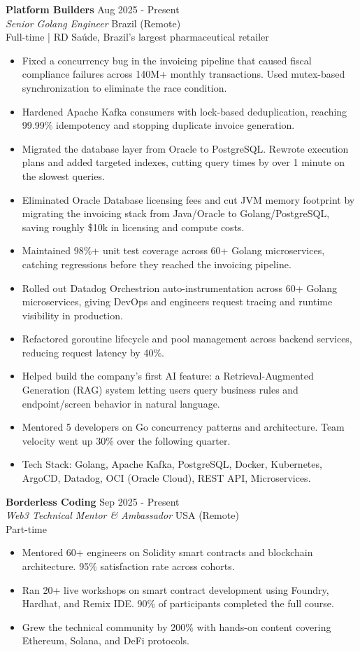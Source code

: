 \documentclass[10pt,a4paper]{article}
\newcommand{\rolehead}[4]{%
    \needspace{4\baselineskip}%
    \textbf{#1} \hfill #2\\
    \textit{#3} \hfill #4\\
}
\begin{document}
\rolehead{Platform Builders}{Aug 2025 - Present}{Senior Golang Engineer}{Brazil (Remote)}
{\footnotesize Full-time | RD Sa\'{u}de, Brazil's largest pharmaceutical retailer}
\nopagebreak
\begin{itemize}
    \item {\footnotesize Fixed a concurrency bug in the invoicing pipeline that caused fiscal compliance failures across 140M+ monthly transactions. Used mutex-based synchronization to eliminate the race condition.}
    \item {\footnotesize Hardened Apache Kafka consumers with lock-based deduplication, reaching 99.99\% idempotency and stopping duplicate invoice generation.}
    \item {\footnotesize Migrated the database layer from Oracle to PostgreSQL. Rewrote execution plans and added targeted indexes, cutting query times by over 1 minute on the slowest queries.}
    \item {\footnotesize Eliminated Oracle Database licensing fees and cut JVM memory footprint by migrating the invoicing stack from Java/Oracle to Golang/PostgreSQL, saving roughly \$10k in licensing and compute costs.}
    \item {\footnotesize Maintained 98\%+ unit test coverage across 60+ Golang microservices, catching regressions before they reached the invoicing pipeline.}
    \item {\footnotesize Rolled out Datadog Orchestrion auto-instrumentation across 60+ Golang microservices, giving DevOps and engineers request tracing and runtime visibility in production.}
    \item {\footnotesize Refactored goroutine lifecycle and pool management across backend services, reducing request latency by 40\%.}
    \item {\footnotesize Helped build the company's first AI feature: a Retrieval-Augmented Generation (RAG) system letting users query business rules and endpoint/screen behavior in natural language.}
    \item {\footnotesize Mentored 5 developers on Go concurrency patterns and architecture. Team velocity went up 30\% over the following quarter.}
    \item {\footnotesize Tech Stack: Golang, Apache Kafka, PostgreSQL, Docker, Kubernetes, ArgoCD, Datadog, OCI (Oracle Cloud), REST API, Microservices.}
\end{itemize}

\rolehead{Borderless Coding}{Sep 2025 - Present}{Web3 Technical Mentor \& Ambassador}{USA (Remote)}
{\footnotesize Part-time}
\nopagebreak
\begin{itemize}
    \item {\footnotesize Mentored 60+ engineers on Solidity smart contracts and blockchain architecture. 95\% satisfaction rate across cohorts.}
    \item {\footnotesize Ran 20+ live workshops on smart contract development using Foundry, Hardhat, and Remix IDE. 90\% of participants completed the full course.}
    \item {\footnotesize Grew the technical community by 200\% with hands-on content covering Ethereum, Solana, and DeFi protocols.}
\end{itemize}
\end{document}
